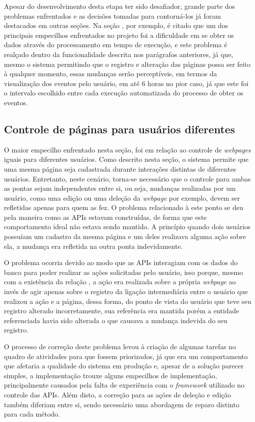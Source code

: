 Apesar do desenvolvimento desta etapa ter sido desafiador, grande parte dos
problemas enfrentados e as decisões tomadas para contorná-los já foram
destacados em outras seções. Na seção , por
exemplo, é citado que um dos principais empecilhos enfrentados no projeto foi a
dificuldade em se obter os dados através do processamento em tempo de execução,
e este problema é realçado dentro da funcionalidade descrita nos parágrafos
anteriores, já que, mesmo o sistema permitindo que o registro e alteração das
páginas possa ser feito à qualquer momento, essas mudanças serão perceptíveis,
em termos da visualização dos eventos pelo usuário, em até 6 horas no pior
caso, já que este foi o intervalo escolhido entre cada execução automatizada do
processo de obter os eventos.

\subsection{Controle de páginas para usuários diferentes}

O maior empecilho enfrentado nesta seção, foi em relação ao controle de
\textit{webpages} iguais para diferentes usuários. Como descrito nesta seção, o
sistema permite que uma mesma página seja cadastrada durante interações
distintas de diferentes usuários. Entretanto, neste cenário, torna-se
necessário que o controle para ambas as pontas sejam independentes entre si, ou
seja, mudanças realizadas por um usuário, como uma edição ou uma deleção da
\textit{webpage} por exemplo, devem ser refletidas apenas para quem as fez. O
problema relacionado à este ponto se deu pela maneira como as \acp{API} estavam
construídas, de forma que este comportamento ideal não estava sendo mantido. A
princípio quando dois usuários possuíam um cadastro da mesma página e um deles
realizava alguma ação sobre ela, a mudança era refletida na outra ponta
indevidamente.

O problema ocorria devido ao modo que as \acp{API} interagiam com os dados do
banco para poder realizar as ações solicitadas pelo usuário, isso porque, mesmo
com a existência da relação , a ação era realizada
sobre a própria \textit{webpage} ao invés de agir apenas sobre o registro da
ligação intermediária entre o usuário que realizou a ação e a página, dessa
forma, do ponto de vista do usuário que teve seu registro alterado
incorretamente, sua referência era mantida porém a entidade referenciada havia
sido alterada o que causava a mudança indevida do seu registro.

O processo de correção deste problema levou à criação de algumas tarefas no
quadro de atividades para que fossem priorizados, já que era um comportamento
que afetaria a qualidade do sistema em produção e, apesar de a solução parecer
simples, a implementação trouxe alguns empecilhos de implementação,
principalmente causados pela falta de experiência com o \textit{framework}
utilizado no controle das \acp{API}. Além disto, a correção para as ações de
deleção e edição também diferiam entre si, sendo necessário uma abordagem de
reparo distinto para cada método.


